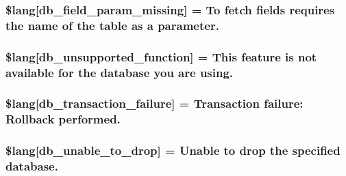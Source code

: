 \subsubsection[{\$lang}]{\setlength{\rightskip}{0pt plus 5cm}\$lang\mbox{[}\textquotesingle{}db\+\_\+field\+\_\+param\+\_\+missing\textquotesingle{}\mbox{]} = \textquotesingle{}To fetch fields requires the name of the table as {\bf a} parameter.\textquotesingle{}}\label{_admin_2system_2language_2english_2db__lang_8php_a9101352a8cd8c8f34a6b8b1e30c45d8a}
\hypertarget{_admin_2system_2language_2english_2db__lang_8php_a77c256be8532e23e8463481f51732116}{}
\subsubsection[{\$lang}]{\setlength{\rightskip}{0pt plus 5cm}\$lang\mbox{[}\textquotesingle{}db\+\_\+unsupported\+\_\+function\textquotesingle{}\mbox{]} = \textquotesingle{}This feature is not available {\bf for} the database you are using.\textquotesingle{}}\label{_admin_2system_2language_2english_2db__lang_8php_a77c256be8532e23e8463481f51732116}
\hypertarget{_admin_2system_2language_2english_2db__lang_8php_a35f225a7ead01f13f8c6423b7c7433a0}{}
\subsubsection[{\$lang}]{\setlength{\rightskip}{0pt plus 5cm}\$lang\mbox{[}\textquotesingle{}db\+\_\+transaction\+\_\+failure\textquotesingle{}\mbox{]} = \textquotesingle{}Transaction failure\+: Rollback performed.\textquotesingle{}}\label{_admin_2system_2language_2english_2db__lang_8php_a35f225a7ead01f13f8c6423b7c7433a0}
\hypertarget{_admin_2system_2language_2english_2db__lang_8php_af391f0d50d64cbb95cd733fa947fdb5e}{}
\subsubsection[{\$lang}]{\setlength{\rightskip}{0pt plus 5cm}\$lang\mbox{[}\textquotesingle{}db\+\_\+unable\+\_\+to\+\_\+drop\textquotesingle{}\mbox{]} = \textquotesingle{}Unable to drop the specified database.\textquotesingle{}}\label{_admin_2system_2language_2english_2db__lang_8php_af391f0d50d64cbb95cd733fa947fdb5e}
\hypertarget{_admin_2system_2language_2english_2db__lang_8php_ac9a47dcf094e785346ea1834e63df941}{}
